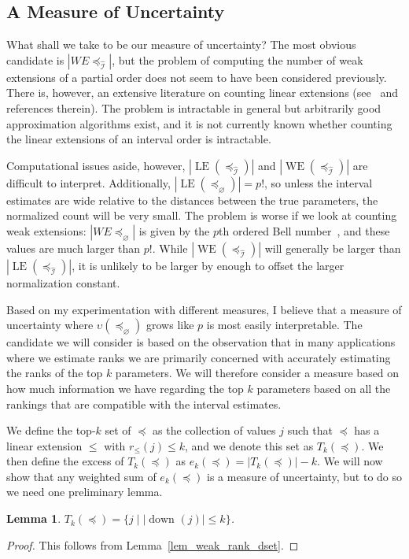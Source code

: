 \documentclass[12pt]{article}
\newcommand{\dset}[2][]{\operatorname{down}_{#1}(#2)}
\newcommand{\eord}{{\preceq_{\varnothing}}}
\newcommand{\iord}{{\preceq_{\hat{\mathcal{I}}}}}
\newcommand{\LE}[1]{\operatorname{LE}(#1)}
\newcommand{\WE}[1]{\operatorname{WE}(#1)}
\numberwithin{theorem}{section}
\newtheorem{lemma}[theorem]{Lemma}
\begin{document}
\subsection{A Measure of Uncertainty}
\label{subsec_uncert_quant_cand}

What shall we take to be our measure of uncertainty?  The most obvious candidate is $|WE{\iord}|$, but the problem of computing the number of weak extensions of a partial order does not seem to have been considered previously.  There is, however, an extensive literature on counting linear extensions (see~\cite{talvitie2018scalableScheme} and references therein).  The problem is intractable in general but arbitrarily good approximation algorithms exist, and it is not currently known whether counting the linear extensions of an interval order is intractable.

Computational issues aside, however, $|\LE{\iord}|$ and $|\WE{\iord}|$ are difficult to interpret.  Additionally, $|\LE{\eord}| = p!$, so unless the interval estimates are wide relative to the distances between the true parameters, the normalized count will be very small.  The problem is worse if we look at counting weak extensions: $|WE{\eord}|$ is given by the $p$th ordered Bell number~, and these values are much larger than $p!$.  While $|\WE{\iord}|$ will generally be larger than $|\LE{\iord}|$, it is unlikely to be larger by enough to offset the larger normalization constant.

Based on my experimentation with different measures, I believe that a measure of uncertainty where $\upsilon(\eord)$ grows like $p$ is most easily interpretable.  The candidate we will consider is based on the observation that in many applications where we estimate ranks we are primarily concerned with accurately estimating the ranks of the top $k$ parameters.  We will therefore consider a measure based on how much information we have regarding the top $k$ parameters based on all the rankings that are compatible with the interval estimates.

We define the top-$k$ set of $\preceq$ as the collection of values $j$ such that $\preceq$ has a linear extension $\leqslant$ with $r_\leqslant(j) \leq k$, and we denote this set as $T_k(\preceq)$.  We then define the excess of $T_k(\preceq)$ as $e_k(\preceq) = |T_k(\preceq)| - k$.  We will now show that any weighted sum of $e_k(\preceq)$ is a measure of uncertainty, but to do so we need one preliminary lemma.

\begin{lemma}
\label{lem_top_set_alt}
$T_k(\preceq) = \{j \mid |\dset{j}| \leq k\}$.
\end{lemma}
\begin{proof}
This follows from Lemma~\ref{lem_weak_rank_dset}.
\end{proof}
\end{document}
